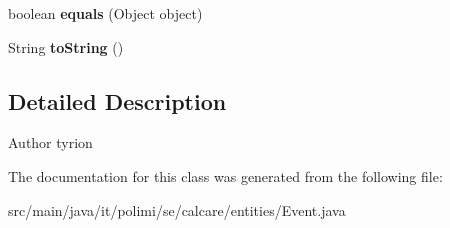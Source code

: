 \begin{DoxyCompactItemize}
\item 
\hypertarget{classit_1_1polimi_1_1se_1_1calcare_1_1entities_1_1Event_a09a889e40e2cbc229f7551e1e7722c51}{}boolean {\bfseries equals} (Object object)\label{classit_1_1polimi_1_1se_1_1calcare_1_1entities_1_1Event_a09a889e40e2cbc229f7551e1e7722c51}

\item 
\hypertarget{classit_1_1polimi_1_1se_1_1calcare_1_1entities_1_1Event_a1a40c338f72de06feae2ccd1528f09e1}{}String {\bfseries to\+String} ()\label{classit_1_1polimi_1_1se_1_1calcare_1_1entities_1_1Event_a1a40c338f72de06feae2ccd1528f09e1}

\end{DoxyCompactItemize}


\subsection{Detailed Description}
\begin{DoxyAuthor}{Author}
tyrion 
\end{DoxyAuthor}


The documentation for this class was generated from the following file\+:\begin{DoxyCompactItemize}
\item 
src/main/java/it/polimi/se/calcare/entities/Event.\+java\end{DoxyCompactItemize}

